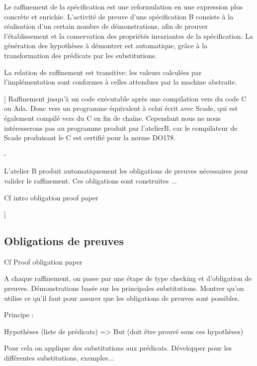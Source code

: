 Le raffinement de la spécification est une reformulation en une
expression plus concrète et enrichie.
L'activité de preuve d'une spécification B consiste à la
réalisation d'un certain nombre de démonstrations, afin de prouver
l'établissement et la conservation des propriétés invariantes de la
spécification.
La génération des hypothèses à démontrer est automatique, grâce à la
transformation des prédicats par les substitutions.

La relation de raffinement est transitive: les valeurs calculées par
l'implémentation sont conformes à celles attendues par la machine
abstraite. 

[
Raffinement jusqu'à un code exécutable après une compilation vers du
code C ou Ada. Donc vers un programme équivalent à celui écrit avec
Scade, qui est également compilé vers du C en fin de chaîne. Cependant
nous ne nous intéresserons pas au programme produit par l'atelierB,
car le compilateur de Scade produisant le C est certifié pour la norme
DO178.

-

L'atelier B produit automatiquement les obligations de preuves
nécessaires pour valider le raffinement. Ces obligations sont
construites ...

Cf intro obligation proof paper

]


\subsection{Obligations de preuves}
Cf Proof obligation paper

A chaque raffinement, on passe par une étape de type checking et
d'obligation de preuves. Démonstrations basée sur les principales
substitutions. Montrer qu'on utilise ce qu'il faut pour assurer que
les obligations de preuves sont possibles.

Principe :

Hypothèses (liste de prédicats)
=>
But (doit être prouvé sous ces hypothèses)

Pour cela on applique des substitutions aux prédicats. Développer pour les
différentes substitutions, exemples...

